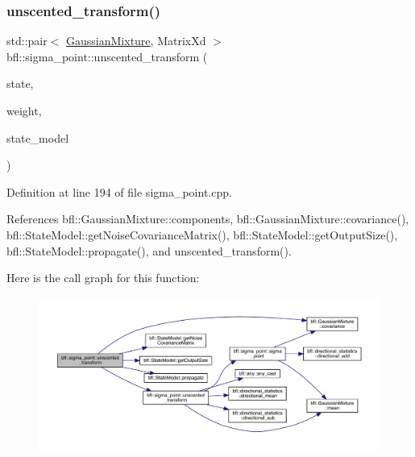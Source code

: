 \subsubsection{\texorpdfstring{unscented\+\_\+transform()}{unscented\_transform()}\hspace{0.1cm}{\footnotesize\ttfamily [4/8]}}
{\footnotesize\ttfamily std\+::pair$<$ \mbox{\hyperlink{classbfl_1_1GaussianMixture}{Gaussian\+Mixture}}, Matrix\+Xd $>$ bfl\+::sigma\+\_\+point\+::unscented\+\_\+transform (\begin{DoxyParamCaption}\item[{const \mbox{\hyperlink{classbfl_1_1GaussianMixture}{Gaussian\+Mixture}} \&}]{state,  }\item[{const \mbox{\hyperlink{structbfl_1_1sigma__point_1_1UTWeight}{U\+T\+Weight}} \&}]{weight,  }\item[{\mbox{\hyperlink{classbfl_1_1AdditiveStateModel}{Additive\+State\+Model}} \&}]{state\+\_\+model }\end{DoxyParamCaption})}



Definition at line 194 of file sigma\+\_\+point.\+cpp.



References bfl\+::\+Gaussian\+Mixture\+::components, bfl\+::\+Gaussian\+Mixture\+::covariance(), bfl\+::\+State\+Model\+::get\+Noise\+Covariance\+Matrix(), bfl\+::\+State\+Model\+::get\+Output\+Size(), bfl\+::\+State\+Model\+::propagate(), and unscented\+\_\+transform().

Here is the call graph for this function\+:
\nopagebreak
\begin{figure}[H]
\begin{center}
\leavevmode
\includegraphics[width=350pt]{namespacebfl_1_1sigma__point_ab1a8018531dbd8a28c08dd3418d1976d_cgraph}
\end{center}
\end{figure}
\mbox{\label{namespacebfl_1_1sigma__point_aa14b7405b4800c5382d402b2446f89c6}} 
